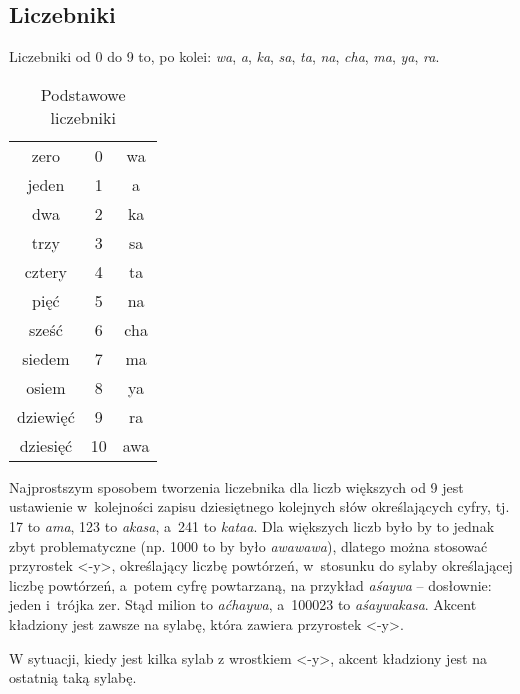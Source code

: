 \begin{spacing}{1.1}


\subsection{Liczebniki}

Liczebniki od 0 do 9 to, po kolei: \emph{wa}, \emph{a}, \emph{ka}, \emph{sa}, 
\emph{ta}, \emph{na}, \emph{cha}, \emph{ma}, \emph{ya}, \emph{ra}.

\begin{table}[ht]
	\centering
	\caption{Podstawowe liczebniki}
	\begin{tabular}{ccc} \toprule
		zero & 0 & wa \\
		jeden & 1 & a \\
		dwa & 2 & ka \\
		trzy & 3 & sa \\
		cztery & 4 & ta \\
		pięć & 5 & na \\
		sześć & 6 & cha \\
		siedem & 7 & ma \\
		osiem & 8 & ya \\
		dziewięć & 9 & ra \\
		dziesięć & 10 & awa \\\bottomrule
	\end{tabular}
	\label{tab:numerals}
\end{table}

Najprostszym sposobem tworzenia liczebnika dla liczb większych od 9 jest
ustawienie w~kolejności zapisu dziesiętnego kolejnych słów określających cyfry,
tj. 17 to \emph{ama}, 123 to \emph{akasa}, a~241 to \emph{kataa}. Dla większych
liczb było by to jednak zbyt problematyczne (np. 1000 to by było
\emph{awawawa}), dlatego można stosować przyrostek <-y>, określający liczbę
powtórzeń, w~stosunku do sylaby określającej liczbę powtórzeń, a~potem cyfrę
powtarzaną, na przykład \emph{aśaywa} -- dosłownie: jeden i~trójka zer. Stąd
milion to \emph{aćhaywa}, a~100023 to \emph{aśaywakasa}. Akcent kładziony jest
zawsze na sylabę, która zawiera przyrostek <-y>.

W sytuacji, kiedy jest kilka sylab z wrostkiem <-y>, akcent kładziony jest na
ostatnią taką sylabę.


\end{spacing}
